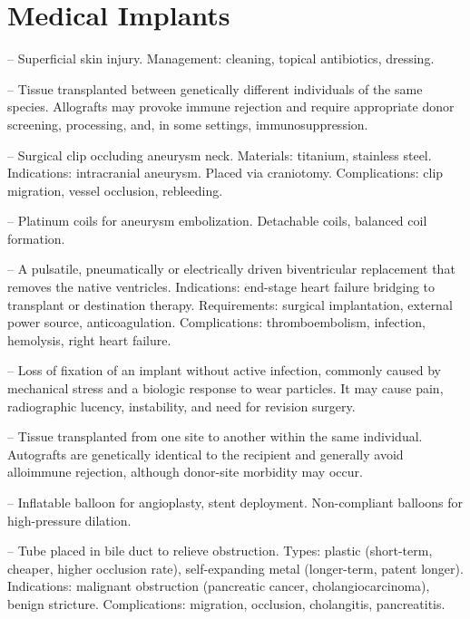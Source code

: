 \chapter{Medical Implants}

-- Superficial skin injury. Management: cleaning, topical antibiotics, dressing.

-- Tissue transplanted between genetically different individuals of the same species. Allografts may provoke immune rejection and require appropriate donor screening, processing, and, in some settings, immunosuppression.

-- Surgical clip occluding aneurysm neck. Materials: titanium, stainless steel. Indications: intracranial aneurysm. Placed via craniotomy. Complications: clip migration, vessel occlusion, rebleeding.

-- Platinum coils for aneurysm embolization. Detachable coils, balanced coil formation.

-- A pulsatile, pneumatically or electrically driven biventricular replacement that removes the native ventricles. Indications: end-stage heart failure bridging to transplant or destination therapy. Requirements: surgical implantation, external power source, anticoagulation. Complications: thromboembolism, infection, hemolysis, right heart failure.

-- Loss of fixation of an implant without active infection, commonly caused by mechanical stress and a biologic response to wear particles. It may cause pain, radiographic lucency, instability, and need for revision surgery.

-- Tissue transplanted from one site to another within the same individual. Autografts are genetically identical to the recipient and generally avoid alloimmune rejection, although donor-site morbidity may occur.

-- Inflatable balloon for angioplasty, stent deployment. Non-compliant balloons for high-pressure dilation.

-- Tube placed in bile duct to relieve obstruction. Types: plastic (short-term, cheaper, higher occlusion rate), self-expanding metal (longer-term, patent longer). Indications: malignant obstruction (pancreatic cancer, cholangiocarcinoma), benign stricture. Complications: migration, occlusion, cholangitis, pancreatitis.

